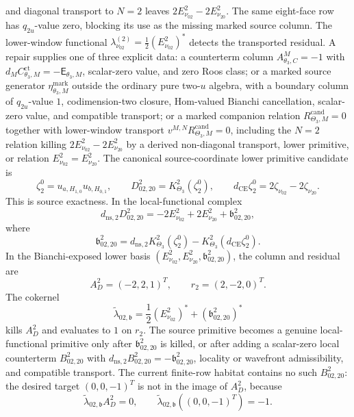 \begin{enumerate}
  and diagonal transport to \(N=2\) leaves
  \(2E^2_{\nu_{02}}-2E^2_{\nu_{20}}\).  The same eight-face row has
  \(q_{2u}\)-value zero, blocking its use as the missing marked
  source column.  The lower-window functional
  \(\lambda^{(2)}_{\nu_{02}}=\frac12(E^2_{\nu_{02}})^*\) detects the
  transported residual.  A repair supplies one of three explicit data:
  a counterterm column
  \(A^M_{\theta_3,C}=-1\) with
  \(d_MC^{\mathrm{ct}}_{\theta_3,M}=-\mathsf E_{\theta_3,M}\),
  scalar-zero value, and zero Roos class; or a marked source generator
  \(\eta^{\mathrm{mark}}_{\theta_3,M}\) outside the ordinary pure
  two-\(u\) algebra, with a boundary column of \(q_{2u}\)-value \(1\),
  codimension-two closure, Hom-valued Bianchi cancellation, scalar-zero
  value, and compatible transport; or a marked companion relation
  \(R^{\mathrm{cand}}_{\Theta_3,M}=0\) together with lower-window
  transport \(v^{M,N}R^{\mathrm{cand}}_{\Theta_3,M}=0\), including the
  \(N=2\) relation killing
  \(2E^2_{\nu_{02}}-2E^2_{\nu_{20}}\) by a derived non-diagonal
  transport, lower primitive, or relation
  \(E^2_{\nu_{02}}=E^2_{\nu_{20}}\).  The canonical source-coordinate
  lower primitive candidate is
  \[
    \zeta^0_2=u_{a,H_{1,0}}u_{b,H_{0,1}},\qquad
    D^2_{02,20}=K^2_{\Theta_3}(\zeta^0_2),
    \qquad
    d_{\mathrm{CE}}\zeta^0_2
    =
    2\zeta_{\nu_{02}}-2\zeta_{\nu_{20}}.
  \]
  This is source exactness.  In the local-functional complex
  \[
    d_{\mathrm{ns},2}D^2_{02,20}
    =
    -2E^2_{\nu_{02}}+2E^2_{\nu_{20}}
    +\mathfrak b^2_{02,20},
  \]
  where
  \[
    \mathfrak b^2_{02,20}
    =
    d_{\mathrm{ns},2}K^2_{\Theta_3}(\zeta^0_2)
    -
    K^2_{\Theta_3}(d_{\mathrm{CE}}\zeta^0_2).
  \]
  In the Bianchi-exposed lower basis
  \((E^2_{\nu_{02}},E^2_{\nu_{20}},\mathfrak b^2_{02,20})\), the column
  and residual are
  \[
    A_D^2=(-2,2,1)^T,\qquad r_2=(2,-2,0)^T .
  \]
  The cokernel
  \[
    \widetilde\lambda_{02,\mathfrak b}
    =
    \frac12(E^2_{\nu_{02}})^*
    +(\mathfrak b^2_{02,20})^*
  \]
  kills \(A_D^2\) and evaluates to \(1\) on \(r_2\).  The source
  primitive becomes a genuine local-functional primitive only after
  \(\mathfrak b^2_{02,20}\) is killed, or after adding a scalar-zero local
  counterterm \(B^2_{02,20}\) with
  \(d_{\mathrm{ns},2}B^2_{02,20}=-\mathfrak b^2_{02,20}\), locality or
  wavefront admissibility, and compatible transport.  The current
  finite-row habitat contains no such \(B^2_{02,20}\): the desired target
  \((0,0,-1)^T\) is not in the image of \(A_D^2\), because
  \[
    \widetilde\lambda_{02,\mathfrak b}A_D^2=0,\qquad
    \widetilde\lambda_{02,\mathfrak b}((0,0,-1)^T)=-1 .
\]
\end{enumerate}
